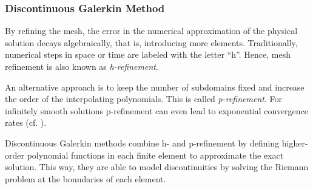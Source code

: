 \subsubsection{Discontinuous Galerkin Method}
\label{sec:polynome-ansatz}

By refining the mesh, the error in the numerical approximation of the physical
solution decays algebraically, that is, introducing more elements.
Traditionally, numerical steps in space or time are labeled with the letter
``h''. Hence, mesh refinement is also known as \emph{h-refinement}.




An alternative approach is to keep the number of subdomains fixed and increase
the order of the interpolating polynomials. This is called \emph{p-refinement}.
For infinitely smooth solutions p-refinement can even lead to exponential
convergence rates (cf. \cite{tugnoli2016locally}).

Discontinuous Galerkin methods combine h- and p-refinement by defining
higher-order polynomial functions in each finite element to approximate the
exact solution. This way, they are able to model discontinuities by solving
the Riemann problem at the boundaries of each element.

